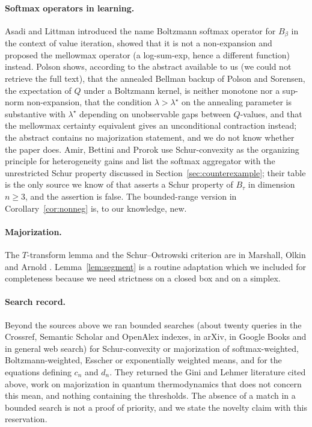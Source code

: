 \documentclass[11pt,a4paper]{article}
\theoremstyle{plain}
\theoremstyle{definition}
\begin{document}
\paragraph{Softmax operators in learning.}
Asadi and Littman \cite{AsadiLittman2017} introduced the name Boltzmann softmax operator for $B_\beta$ in the context of value iteration, showed that it is not a non-expansion and proposed the mellowmax operator (a log-sum-exp, hence a different function) instead. Polson \cite{Polson2026} shows, according to the abstract available to us (we could not retrieve the full text), that the annealed Bellman backup of Polson and Sorensen, the expectation of $Q$ under a Boltzmann kernel, is neither monotone nor a sup-norm non-expansion, that the condition $\lambda>\lambda^\star$ on the annealing parameter is substantive with $\lambda^\star$ depending on unobservable gaps between $Q$-values, and that the mellowmax certainty equivalent gives an unconditional contraction instead; the abstract contains no majorization statement, and we do not know whether the paper does. Amir, Bettini and Prorok \cite{AmirBettiniProrok2026} use Schur-convexity as the organizing principle for heterogeneity gains and list the softmax aggregator with the unrestricted Schur property discussed in Section~\ref{sec:counterexample}; their table is the only source we know of that asserts a Schur property of $B_\tau$ in dimension $n\ge 3$, and the assertion is false. The bounded-range version in Corollary~\ref{cor:nonneg} is, to our knowledge, new.

\paragraph{Majorization.}
The $T$-transform lemma and the Schur--Ostrowski criterion are in Marshall, Olkin and Arnold \cite{MarshallOlkinArnold2011}. Lemma~\ref{lem:segment} is a routine adaptation which we included for completeness because we need strictness on a closed box and on a simplex.

\paragraph{Search record.}
Beyond the sources above we ran bounded searches (about twenty queries in the Crossref, Semantic Scholar and OpenAlex indexes, in arXiv, in Google Books and in general web search) for Schur-convexity or majorization of softmax-weighted, Boltzmann-weighted, Esscher or exponentially weighted means, and for the equations defining $c_n$ and $d_n$. They returned the Gini and Lehmer literature cited above, work on majorization in quantum thermodynamics that does not concern this mean, and nothing containing the thresholds. The absence of a match in a bounded search is not a proof of priority, and we state the novelty claim with this reservation.



\end{document}
